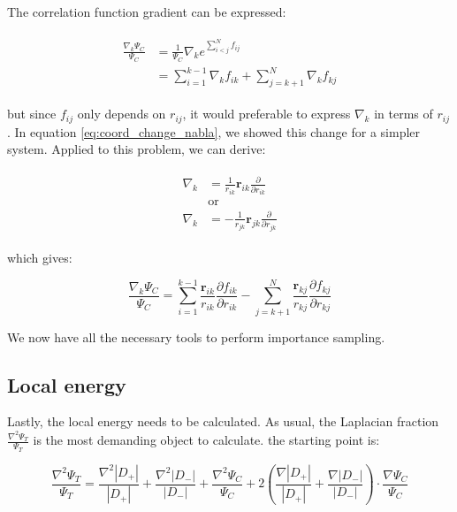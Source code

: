 \documentclass[english, a4paper]{article}
\newcommand{\bm}[1]{\mathbf{#1}}
\begin{document}
The correlation function gradient can be expressed:

\begin{align}
	\begin{split}
	\frac{\nabla_k \Psi_C}{\Psi_C} &= \frac{1}{\Psi_C}\nabla_k e^{\sum_{i<j}^Nf_{ij}}\\
	&= \sum_{i=1}^{k-1}\nabla_kf_{ik} + \sum_{j=k+1}^{N}\nabla_kf_{kj}
	\end{split}
\end{align}

but since $f_{ij}$ only depends on $r_{ij}$, it would preferable to express $\nabla_k$ in terms of $r_{ij}$. In equation \ref{eq:coord_change_nabla}, we showed this change for a simpler system. Applied to this problem, we can derive:

\begin{align}
	\begin{split}
	\nabla_k &=  \frac{1}{r_{ik}}\bm{r}_{ik}\frac{\partial}{\partial r_{ik}}\\
	&\text{or}\\
	\nabla_k &=  -\frac{1}{r_{jk}}\bm{r}_{jk}\frac{\partial}{\partial r_{jk}}
	\end{split}
\end{align}

which gives:

\begin{equation}
	\frac{\nabla_k \Psi_C}{\Psi_C} = \sum_{i=1}^{k-1}\frac{\bm{r}_{ik}}{r_{ik}}\frac{\partial f_{ik}}{\partial r_{ik}} - \sum_{j=k+1}^{N}\frac{\bm{r}_{kj}}{r_{kj}}\frac{\partial f_{kj}}{\partial r_{kj}}
\end{equation}

We now have all the necessary tools to perform importance sampling.

\subsection{Local energy}
Lastly, the local energy needs to be calculated. As usual, the Laplacian fraction $\frac{\nabla^2\Psi_T}{\Psi_T}$ is the most demanding object to calculate. the starting point is:

\begin{equation}
	\frac{\nabla^2\Psi_T}{\Psi_T} = \frac{\nabla^2 |D_+|}{|D_+|} + \frac{\nabla^2 |D_-|}{|D_-|} + \frac{\nabla^2 \Psi_C}{\Psi_C} + 2\left( \frac{\nabla |D_+|}{|D_+|} + \frac{\nabla |D_-|}{|D_-|} \right)\cdot\frac{\nabla \Psi_C}{\Psi_C}
\end{equation}
\end{document}
